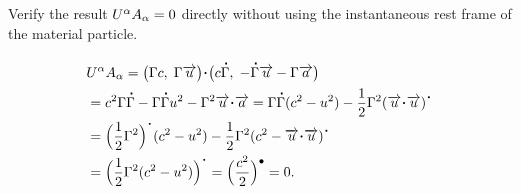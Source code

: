 \exm   Verify the result $U^{{\alpha}} A_ {{\alpha}} =0$ 
directly without using the instantaneous rest frame of 
the material particle.

\soln\begin{align*} &U^\gka A_\gka = \big(\Gamma
c,\;\Gamma\veca{u}\big)\dotp
\big(c\dot{\Gamma},\;-\dot{\Gamma}\veca
{u} -\Gamma\veca{a}\big) \\
&=c^2\Gamma\dot{\Gamma}-\Gamma\dot{\Gamma}u^2
-\Gamma^2\veca{u}\dotp\veca{a}
=\Gamma\dot{\Gamma}(c^2-u^2) 
-\frac{1}{2}{\Gamma^2}(\veca{u}\dotp\veca{u})^{\dotp} 
\\
&=\Big(\frac{1}{2}{\Gamma^2}\Big)^{\dotp}
(c^2-u^2)-\frac{1}{2}{\Gamma^2
}(c^2-\veca{u}\dotp\veca{u})^{\dotp}\\
&=\Big(\frac{1}{2}{\Gamma^2}(c^2-u^2) \Big)^{\dotp}
=\Big(\frac{c^2}{2}\Big)^{\bullet}=0. 
\end{align*}
\ebx

